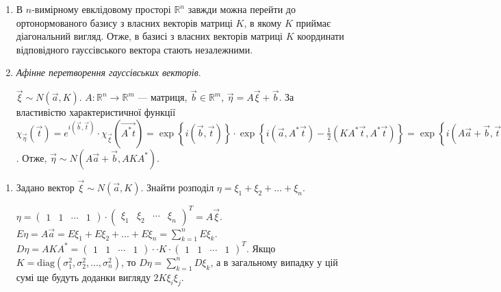 \begin{enumerate}
\begin{proof}
        Якщо координати некорельовані, то кореляційна матриця $K = \mathrm{diag}(\sigma_1^2, \sigma_2^2, ..., \sigma_n^2)$.
        Тоді $\left( K \vec{t}, \vec{t}\right) = \sum_{k=1}^n \sigma_k^2 t_k^2$.
        Тоді $\chi_{\vec{\xi}}(\vec{t}) = \exp\left\{i(\vec{a}, \vec{t}) - \frac{1}{2}\left( K \vec{t}, \vec{t}\right)\right\} = \prod\limits_{k=1}^n e^{i a_k t_k - \frac{1}{2}\sigma_k^2 t_k^2} = \prod\limits_{k=1}^n \chi_{\xi_k}(t_k)$
        і координати незалежні.
    \end{proof}
    \item В $n$-вимірному евклідовому просторі $\mathbb{R}^n$ завжди можна перейти до
    ортонормованого базису з власних векторів матриці $K$, в якому $K$ приймає діагональний вигляд.
    Отже, в базисі з власних векторів матриці $K$ координати відповідного гауссівського вектора стають незалежними.
    \item \emph{Афінне перетворення гауссівських векторів}.

    $\vec{\xi} \sim {N}(\vec{a}, K)$. $A : \mathbb{R}^n \rightarrow \mathbb{R}^m$ --- матриця, $\vec{b} \in \mathbb{R}^m$, $\vec{\eta} = A\vec{\xi} + \vec{b}$.
    За властивістю характеристичної функції $\chi_{\vec{\eta}}(\vec{t}) = e^{i(\vec{b}, \vec{t})}\cdot\chi_{\vec{\xi}}(\vec{A^{*}t}) =
    \exp\left\{i(\vec{b}, \vec{t})\right\}\cdot \exp\left\{i(\vec{a}, A^{*}\vec{t}) - \frac{1}{2}\left( K A^{*}\vec{t}, A^{*}\vec{t}\right)\right\} =
    \exp\left\{i(A\vec{a} + \vec{b}, \vec{t}) - \frac{1}{2}\left( A K A^{*}\vec{t}, \vec{t}\right)\right\}$. Отже, $\vec{\eta} \sim {N}(A\vec{a} + \vec{b}, A K A^{*})$.
\end{enumerate}
\begin{example}
    \begin{enumerate}
        \item Задано вектор $\vec{\xi} \sim {N}(\vec{a}, K)$. Знайти розподіл $\eta = \xi_1 + \xi_2 + ... + \xi_n$.

        $\eta = \begin{pmatrix}
            1 & 1 & \cdots & 1
        \end{pmatrix}\cdot
        \begin{pmatrix}
            \xi_1 & \xi_2 & \cdots & \xi_n
        \end{pmatrix}^T = A\vec{\xi}$.
        $E\eta = A\vec{a} = E\xi_1 + E\xi_2 + ... + E\xi_n = \sum\limits_{k=1}^n E\xi_k$.
        $D\eta = A K A^{*} = \begin{pmatrix}
            1 & 1 & \cdots & 1
        \end{pmatrix}\cdot
        \cdot K \cdot \begin{pmatrix}
            1 & 1 & \cdots & 1
        \end{pmatrix}^T$. Якщо $K = \mathrm{diag}(\sigma_1^2, \sigma_2^2, ..., \sigma_n^2)$, то $D\eta = \sum\limits_{k=1}^n D\xi_k$,
        а в загальному випадку у цій сумі ще будуть доданки вигляду $2K\xi_i\xi_j$.
    \end{enumerate}
\end{example}